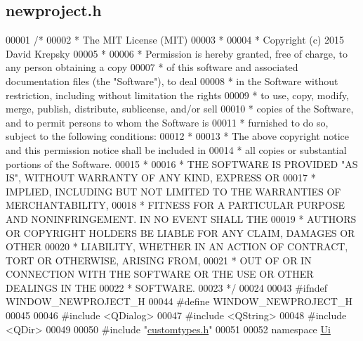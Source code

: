 \hypertarget{newproject_8h_source}{}\subsection{newproject.\+h}
\label{newproject_8h_source}

\begin{DoxyCode}
00001 \textcolor{comment}{/*}
00002 \textcolor{comment}{ * The MIT License (MIT)}
00003 \textcolor{comment}{ *}
00004 \textcolor{comment}{ * Copyright (c) 2015 David Krepsky}
00005 \textcolor{comment}{ *}
00006 \textcolor{comment}{ * Permission is hereby granted, free of charge, to any person obtaining a copy}
00007 \textcolor{comment}{ * of this software and associated documentation files (the "Software"), to deal}
00008 \textcolor{comment}{ * in the Software without restriction, including without limitation the rights}
00009 \textcolor{comment}{ * to use, copy, modify, merge, publish, distribute, sublicense, and/or sell}
00010 \textcolor{comment}{ * copies of the Software, and to permit persons to whom the Software is}
00011 \textcolor{comment}{ * furnished to do so, subject to the following conditions:}
00012 \textcolor{comment}{ *}
00013 \textcolor{comment}{ * The above copyright notice and this permission notice shall be included in}
00014 \textcolor{comment}{ * all copies or substantial portions of the Software.}
00015 \textcolor{comment}{ *}
00016 \textcolor{comment}{ * THE SOFTWARE IS PROVIDED "AS IS", WITHOUT WARRANTY OF ANY KIND, EXPRESS OR}
00017 \textcolor{comment}{ * IMPLIED, INCLUDING BUT NOT LIMITED TO THE WARRANTIES OF MERCHANTABILITY,}
00018 \textcolor{comment}{ * FITNESS FOR A PARTICULAR PURPOSE AND NONINFRINGEMENT. IN NO EVENT SHALL THE}
00019 \textcolor{comment}{ * AUTHORS OR COPYRIGHT HOLDERS BE LIABLE FOR ANY CLAIM, DAMAGES OR OTHER}
00020 \textcolor{comment}{ * LIABILITY, WHETHER IN AN ACTION OF CONTRACT, TORT OR OTHERWISE, ARISING FROM,}
00021 \textcolor{comment}{ * OUT OF OR IN CONNECTION WITH THE SOFTWARE OR THE USE OR OTHER DEALINGS IN THE}
00022 \textcolor{comment}{ * SOFTWARE.}
00023 \textcolor{comment}{ */}
00024 
00043 \textcolor{preprocessor}{#ifndef WINDOW\_NEWPROJECT\_H}
00044 \textcolor{preprocessor}{#define WINDOW\_NEWPROJECT\_H}
00045 
00046 \textcolor{preprocessor}{#include <QDialog>}
00047 \textcolor{preprocessor}{#include <QString>}
00048 \textcolor{preprocessor}{#include <QDir>}
00049 
00050 \textcolor{preprocessor}{#include "\hyperlink{customtypes_8h}{customtypes.h}"}
00051 
00052 \textcolor{keyword}{namespace }\hyperlink{namespace_ui}{Ui}

\end{DoxyCode}
